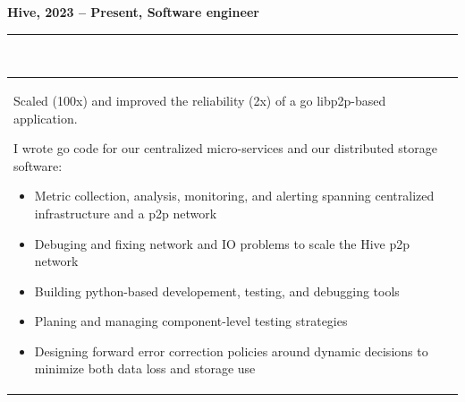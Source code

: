 \documentclass[a4paper,12pt]{article}
\newcommand{\ligne}[1]{\rule[0.5ex]{\textwidth}{#1}\\}
\newcommand{\styleRub}[1]{\textbf{\large #1}\par}
\newcommand{\indentStd}{\noindent\hspace*{10pt}}
\newenvironment{rubrique}[2][\linewidth]%
{\styleRub{#2}%
\ligne{0.5mm}
\setlength{\lenB}{#1}%
\setlength{\lenC}{\linewidth}%
\addtolength{\lenC}{-\lenA}%
\addtolength{\lenC}{-\lenB}%
\addtolength{\lenC}{-19pt}
\indentStd\begin{tabular}[t]{p{\lenB}p{\lenC}}}
{\end{tabular}}
\newlength{\lenA} %
\newlength{\lenB} %
\newlength{\lenC} %
\begin{document}
\vspace{0.5cm}
\begin{rubrique}{Hive, 2023 -- Present, Software engineer}

Scaled (100x) and improved the reliability (2x) of a go libp2p-based application.

I wrote go code for our centralized micro-services and our distributed
storage software:
\begin{itemize}
\item Metric collection, analysis, monitoring, and alerting
        spanning centralized infrastructure and a p2p network
\item Debuging and fixing network and IO problems to scale the Hive p2p network
\item Building python-based developement, testing, and debugging tools
\item Planing and managing component-level testing strategies
\item Designing forward error correction policies around dynamic
        decisions to minimize both data loss and storage use
\end{itemize}

\end{rubrique}
\pagebreak
\end{document}
